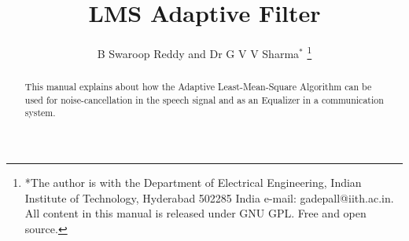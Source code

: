 \documentclass[journal,12pt,twocolumn]{IEEEtran}
\begin{document}
\let\StandardTheFigure\thefigure
\renewcommand{\thefigure}{\theproblem}



\makeatletter
{}
\makeatother

\let\StandardTheFigure\thefigure
\let\StandardTheTable\thetable





\def\putbox#1#2#3{\makebox[0in][l]{\makebox[#1][l]{}\raisebox{\baselineskip}[0in][0in]{\raisebox{#2}[0in][0in]{#3}}}}
     \def\rightbox#1{\makebox[0in][r]{#1}}
     \def\centbox#1{\makebox[0in]{#1}}
     \def\topbox#1{\raisebox{-\baselineskip}[0in][0in]{#1}}
     \def\midbox#1{\raisebox{-0.5\baselineskip}[0in][0in]{#1}}

\vspace{3cm}

\title{ 
LMS Adaptive Filter
}

\author{B Swaroop Reddy and Dr G V V Sharma$^{*}$%
	\thanks{*The author is with the Department
		of Electrical Engineering, Indian Institute of Technology, Hyderabad
		502285 India e-mail:  gadepall@iith.ac.in. All content in this manual is released under GNU GPL.  Free and open source.}
	
}	

\maketitle

\tableofcontents
\bigskip

\begin{abstract}
	
	This manual explains about how the Adaptive Least-Mean-Square Algorithm can be used for noise-cancellation in the speech signal and as an Equalizer in a communication system.
	
\end{abstract}
\end{document}
